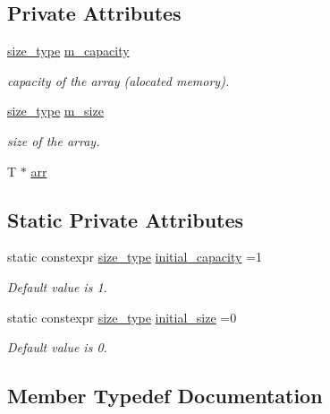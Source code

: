 \subsection*{Private Attributes}
\begin{DoxyCompactItemize}
\item 
\hyperlink{classsc_1_1vector_aa4500ebad5be45f8d469fc4b5d62b19d}{size\+\_\+type} \hyperlink{classsc_1_1vector_a566372683113653e90132001ddec8baa}{m\+\_\+capacity}
\begin{DoxyCompactList}\small\item\em capacity of the array (alocated memory). \end{DoxyCompactList}\item 
\hyperlink{classsc_1_1vector_aa4500ebad5be45f8d469fc4b5d62b19d}{size\+\_\+type} \hyperlink{classsc_1_1vector_a314ee71f4aec4b0507921d6f7e736aa3}{m\+\_\+size}
\begin{DoxyCompactList}\small\item\em size of the array. \end{DoxyCompactList}\item 
T $\ast$ \hyperlink{classsc_1_1vector_a76dc24c57c0f431c72593f01213ec6f9}{arr}
\end{DoxyCompactItemize}
\subsection*{Static Private Attributes}
\begin{DoxyCompactItemize}
\item 
static constexpr \hyperlink{classsc_1_1vector_aa4500ebad5be45f8d469fc4b5d62b19d}{size\+\_\+type} \hyperlink{classsc_1_1vector_af204bbfa1577f385dba49a08c8edae7c}{initial\+\_\+capacity} =1
\begin{DoxyCompactList}\small\item\em Default value is 1. \end{DoxyCompactList}\item 
static constexpr \hyperlink{classsc_1_1vector_aa4500ebad5be45f8d469fc4b5d62b19d}{size\+\_\+type} \hyperlink{classsc_1_1vector_ae72361ba48d0f8b5f75140afaa71e9c6}{initial\+\_\+size} =0
\begin{DoxyCompactList}\small\item\em Default value is 0. \end{DoxyCompactList}\end{DoxyCompactItemize}


\subsection{Member Typedef Documentation}
\mbox{\label{classsc_1_1vector_aa4500ebad5be45f8d469fc4b5d62b19d}} 
